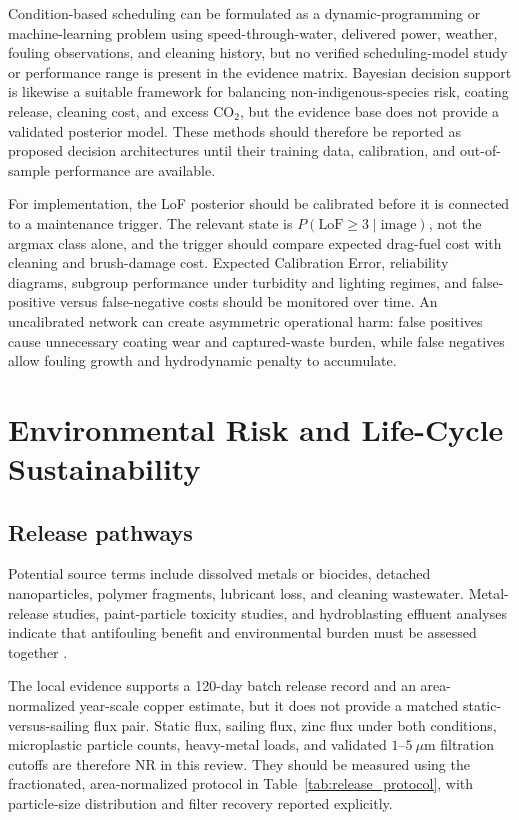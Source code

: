 Condition-based scheduling can be formulated as a dynamic-programming or machine-learning problem using speed-through-water, delivered power, weather, fouling observations, and cleaning history, but no verified scheduling-model study or performance range is present in the evidence matrix. Bayesian decision support is likewise a suitable framework for balancing non-indigenous-species risk, coating release, cleaning cost, and excess CO$_2$, but the evidence base does not provide a validated posterior model. These methods should therefore be reported as proposed decision architectures until their training data, calibration, and out-of-sample performance are available.

For implementation, the LoF posterior should be calibrated before it is connected to a maintenance trigger. The relevant state is $P(\mathrm{LoF}\geq3\mid\mathrm{image})$, not the argmax class alone, and the trigger should compare expected drag-fuel cost with cleaning and brush-damage cost. Expected Calibration Error, reliability diagrams, subgroup performance under turbidity and lighting regimes, and false-positive versus false-negative costs should be monitored over time. An uncalibrated network can create asymmetric operational harm: false positives cause unnecessary coating wear and captured-waste burden, while false negatives allow fouling growth and hydrodynamic penalty to accumulate.

\section{Environmental Risk and Life-Cycle Sustainability}
\subsection{Release pathways}
Potential source terms include dissolved metals or biocides, detached nanoparticles, polymer fragments, lubricant loss, and cleaning wastewater. Metal-release studies, paint-particle toxicity studies, and hydroblasting effluent analyses indicate that antifouling benefit and environmental burden must be assessed together \cite{miller_nano_2020,kim_qualitative_2024,soon_characterization_2021}.

The local evidence supports a 120-day batch release record and an area-normalized year-scale copper estimate, but it does not provide a matched static-versus-sailing flux pair. Static flux, sailing flux, zinc flux under both conditions, microplastic particle counts, heavy-metal loads, and validated $1$--$5~\mu$m filtration cutoffs are therefore NR in this review. They should be measured using the fractionated, area-normalized protocol in Table~\ref{tab:release_protocol}, with particle-size distribution and filter recovery reported explicitly.

